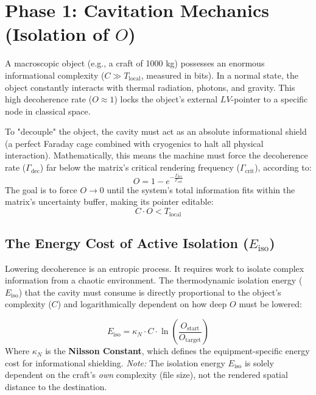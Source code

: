 \documentclass[12pt,a4paper]{article}
\begin{document}
\section{Phase 1: Cavitation Mechanics (Isolation of $O$)}

A macroscopic object (e.g., a craft of 1000 kg) possesses an enormous informational complexity ($C \gg T_{\mathrm{local}}$, measured in bits). In a normal state, the object constantly interacts with thermal radiation, photons, and gravity. This high decoherence rate ($O \approx 1$) locks the object's external $LV$-pointer to a specific node in classical space.

To "decouple" the object, the cavity must act as an absolute informational shield (a perfect Faraday cage combined with cryogenics to halt all physical interaction). Mathematically, this means the machine must force the decoherence rate ($\Gamma_{\text{dec}}$) far below the matrix's critical rendering frequency ($\Gamma_{\text{crit}}$), according to:
\begin{equation}
O = 1 - e^{-\frac{\Gamma_{\text{dec}}}{\Gamma_{\text{crit}}}}
\end{equation}
The goal is to force $O \to 0$ until the system's total information fits within the matrix's uncertainty buffer, making its pointer editable:
\begin{equation}
C \cdot O < T_{\mathrm{local}}
\end{equation}

\subsection{The Energy Cost of Active Isolation ($E_{\mathrm{iso}}$)}
Lowering decoherence is an entropic process. It requires work to isolate complex information from a chaotic environment. The thermodynamic isolation energy ($E_{\mathrm{iso}}$) that the cavity must consume is directly proportional to the object's complexity ($C$) and logarithmically dependent on how deep $O$ must be lowered:

\begin{equation}\label{eq:isolation}
\boxed{ E_{\mathrm{iso}} = \kappa_N \cdot C \cdot \ln\left(\frac{O_{\text{start}}}{O_{\text{target}}}\right) }
\end{equation}
Where $\kappa_N$ is the \textbf{Nilsson Constant}, which defines the equipment-specific energy cost for informational shielding. 
\textit{Note:} The isolation energy $E_{\mathrm{iso}}$ is solely dependent on the craft's \textit{own} complexity (file size), not the rendered spatial distance to the destination.
\end{document}
